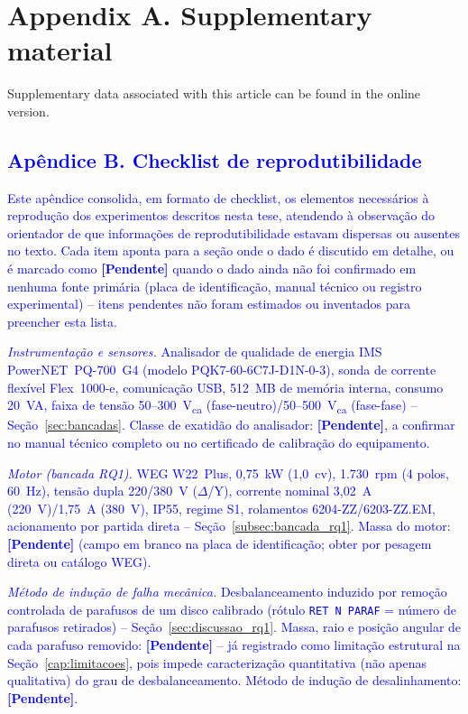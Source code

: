 \documentclass[times,final]{elsarticle}
\begin{document}
\section*{Appendix A. Supplementary material}
Supplementary data associated with this article can be found in the online version.
\textcolor{blue}{
\section*{Apêndice B. Checklist de reprodutibilidade}
Este apêndice consolida, em formato de checklist, os elementos necessários à reprodução dos experimentos descritos nesta tese, atendendo à observação do orientador de que informações de reprodutibilidade estavam dispersas ou ausentes no texto. Cada item aponta para a seção onde o dado é discutido em detalhe, ou é marcado como \textbf{[Pendente]} quando o dado ainda não foi confirmado em nenhuma fonte primária (placa de identificação, manual técnico ou registro experimental) -- itens pendentes não foram estimados ou inventados para preencher esta lista.

\textit{Instrumentação e sensores.} Analisador de qualidade de energia IMS PowerNET~PQ-700~G4 (modelo PQK7-60-6C7J-D1N-0-3), sonda de corrente flexível Flex~1000-e, comunicação USB, 512~MB de memória interna, consumo 20~VA, faixa de tensão 50--300~V\textsubscript{ca} (fase-neutro)/50--500~V\textsubscript{ca} (fase-fase) -- Seção~\ref{sec:bancadas}. Classe de exatidão do analisador: \textbf{[Pendente]}, a confirmar no manual técnico completo ou no certificado de calibração do equipamento.

\textit{Motor (bancada RQ1).} WEG W22~Plus, 0,75~kW (1,0~cv), 1.730~rpm (4 polos, 60~Hz), tensão dupla 220/380~V ($\Delta$/Y), corrente nominal 3,02~A (220~V)/1,75~A (380~V), IP55, regime S1, rolamentos 6204-ZZ/6203-ZZ.EM, acionamento por partida direta -- Seção~\ref{subsec:bancada_rq1}. Massa do motor: \textbf{[Pendente]} (campo em branco na placa de identificação; obter por pesagem direta ou catálogo WEG).

\textit{Método de indução de falha mecânica.} Desbalanceamento induzido por remoção controlada de parafusos de um disco calibrado (rótulo \texttt{RET~N~PARAF} = número de parafusos retirados) -- Seção~\ref{sec:discussao_rq1}. Massa, raio e posição angular de cada parafuso removido: \textbf{[Pendente]} -- já registrado como limitação estrutural na Seção~\ref{cap:limitacoes}, pois impede caracterização quantitativa (não apenas qualitativa) do grau de desbalanceamento. Método de indução de desalinhamento: \textbf{[Pendente]}.

}
\end{document}
